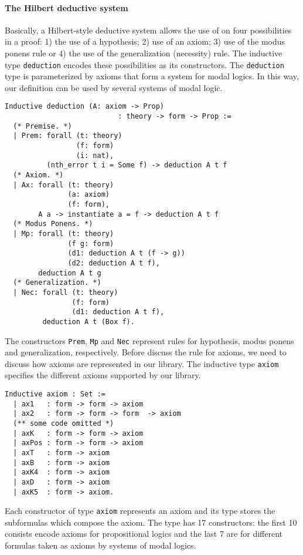 \documentclass[sigconf,anonymous]{acmart}
\begin{document}
\paragraph{The Hilbert deductive system}
Basically, a Hilbert-style deductive system allows the use of on four
possibilities in a proof: 1) the use of a hypothesis; 2) use of an axiom;
3) use of the modus ponens rule or 4) the use of the generalization (necessity)
rule. The inductive type \texttt{deduction} encodes these possibilities
as its constructors. The \texttt{deduction} type is parameterized by
axioms that form a system for modal logics. In this way, our definition can be
used by several systems of modal logic.
\begin{verbatim}
Inductive deduction (A: axiom -> Prop)
                           : theory -> form -> Prop :=
  (* Premise. *)
  | Prem: forall (t: theory)
                 (f: form)
                 (i: nat),
          (nth_error t i = Some f) -> deduction A t f
  (* Axiom. *)
  | Ax: forall (t: theory)
               (a: axiom)
               (f: form),
        A a -> instantiate a = f -> deduction A t f
  (* Modus Ponens. *)
  | Mp: forall (t: theory)
               (f g: form)
               (d1: deduction A t (f -> g))
               (d2: deduction A t f),
        deduction A t g
  (* Generalization. *)
  | Nec: forall (t: theory)
                (f: form)
                (d1: deduction A t f),
         deduction A t (Box f).
\end{verbatim}
The constructors \texttt{Prem}, \texttt{Mp} and \texttt{Nec}
represent rules for hypothesis, modus ponens and generalization, respectively.
Before discuss the rule for axioms, we need to discuss how axioms are
represented in our library. The inductive type \texttt{axiom} specifies
the different axioms supported by our library.
\begin{verbatim}
Inductive axiom : Set :=
  | ax1   : form -> form -> axiom
  | ax2   : form -> form -> form  -> axiom
  (** some code omitted *)
  | axK   : form -> form -> axiom
  | axPos : form -> form -> axiom
  | axT   : form -> axiom
  | axB   : form -> axiom
  | axK4  : form -> axiom
  | axD   : form -> axiom
  | axK5  : form -> axiom.
\end{verbatim}
Each constructor of type \texttt{axiom} represents an axiom and
its type stores the subformulas which compose the axiom. The type has
17 constructors: the first 10 consists encode axioms for propositional logics
and the last 7 are for different formulas taken as axioms by systems of modal logics.
\end{document}
